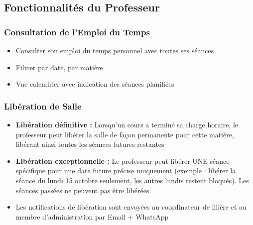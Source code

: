 \documentclass[12pt,a4paper]{article}
\begin{document}
\subsection{Fonctionnalités du Professeur}

\subsubsection{Consultation de l'Emploi du Temps}
\begin{itemize}
    \item Consulter son emploi du temps personnel avec toutes ses séances
    \item Filtrer par date, par matière
    \item Vue calendrier avec indication des séances planifiées
\end{itemize}

\subsubsection{Libération de Salle}
\begin{itemize}
    \item \textbf{Libération définitive :} Lorsqu'un cours a terminé sa charge horaire, le professeur peut libérer la salle de façon permanente pour cette matière, libérant ainsi toutes les séances futures restantes
    \item \textbf{Libération exceptionnelle :} Le professeur peut libérer UNE séance spécifique pour une date future précise uniquement (exemple : libérer la séance du lundi 15 octobre seulement, les autres lundis restent bloqués). Les séances passées ne peuvent pas être libérées
    \item Les notifications de libération sont envoyées au coordinateur de filière et au membre d'administration par Email + WhatsApp
\end{itemize}
\end{document}
